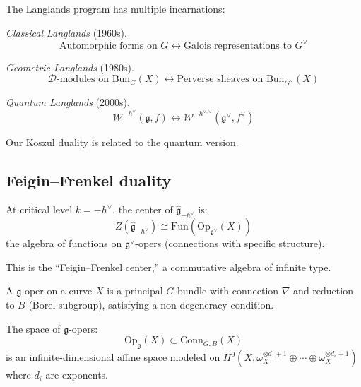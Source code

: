 \begin{context}
The Langlands program has multiple incarnations:

\emph{Classical Langlands} (1960s).
\begin{equation}
\text{Automorphic forms on } G \longleftrightarrow \text{Galois representations to } G^\vee
\end{equation}

\emph{Geometric Langlands} (1980s).
\begin{equation}
\mathcal{D}\text{-modules on } \mathrm{Bun}_G(X) \longleftrightarrow \text{Perverse sheaves on } \mathrm{Bun}_{G^\vee}(X)
\end{equation}

\emph{Quantum Langlands} (2000s).
\begin{equation}
\mathcal{W}^{-h^\vee}(\mathfrak{g}, f) \longleftrightarrow \mathcal{W}^{-h^{\vee,\vee}}(\mathfrak{g}^\vee, f^\vee)
\end{equation}

Our Koszul duality is related to the quantum version.
\end{context}

\subsection{Feigin--Frenkel duality}

\begin{theorem}\label{thm:feigin-frenkel-center}
At critical level $k = -h^\vee$, the center of $\widehat{\mathfrak{g}}_{-h^\vee}$ is:
\begin{equation}
Z(\widehat{\mathfrak{g}}_{-h^\vee}) \cong \mathrm{Fun}(\mathrm{Op}_{\mathfrak{g}^\vee}(X))
\end{equation}
the algebra of functions on $\mathfrak{g}^\vee$-opers (connections with specific structure).

This is the ``Feigin--Frenkel center,'' a commutative algebra of infinite type.
\end{theorem}

\begin{definition}[Opers]
A $\mathfrak{g}$-oper on a curve $X$ is a principal $G$-bundle with connection $\nabla$ and reduction to $B$ (Borel subgroup), satisfying a non-degeneracy condition.

The space of $\mathfrak{g}$-opers:
\begin{equation}
\mathrm{Op}_{\mathfrak{g}}(X) \subset \mathrm{Conn}_{G,B}(X)
\end{equation}
is an infinite-dimensional affine space modeled on $H^0(X, \omega_X^{\otimes d_1+1} \oplus \cdots \oplus \omega_X^{\otimes d_r+1})$ where $d_i$ are exponents.
\end{definition}

